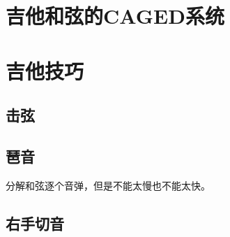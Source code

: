 \documentclass[UTF8,a4paper,12pt]{ctexbook}
\begin{document}
	
	\section{吉他和弦的CAGED系统}
	
	
	
	\section{吉他技巧}
		\subsection{击弦}
		
		\subsection{琶音}
			分解和弦逐个音弹，但是不能太慢也不能太快。
			
		\subsection{右手切音}
		
		    
\end{document}
